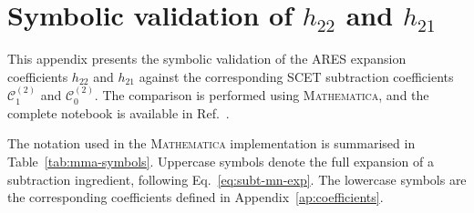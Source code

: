 \chapter{Symbolic validation of \texorpdfstring{$h_{22}$}{h22} and
         \texorpdfstring{$h_{21}$}{h21}}
\label{ap:symb-val}

This appendix presents the symbolic validation of the \textsc{ARES}
expansion coefficients $h_{22}$ and $h_{21}$ against the corresponding
SCET subtraction coefficients $\mathcal{C}^{(2)}_1$ and
$\mathcal{C}^{(2)}_0$. The comparison is performed using
\textsc{Mathematica}, and the complete notebook is available in
Ref.~\cite{peake2026validation}.

The notation used in the \textsc{Mathematica} implementation is summarised
in Table~\ref{tab:mma-symbols}. Uppercase symbols denote the full
expansion of a subtraction ingredient, following
Eq.~\eqref{eq:subt-mn-exp}. The lowercase symbols are the corresponding
coefficients defined in Appendix~\ref{ap:coefficients}.

